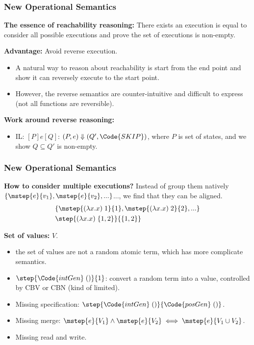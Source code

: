 \newcommand{\store}[1]{\langle #1 \rangle}

\begin{frame}[fragile]
    \frametitle{New Operational Semantics}

\textbf{The essence of reachability reasoning:} There exists an execution is equal to consider all possible executions and prove the set of executions is non-empty.

\textbf{Advantage:} Avoid reverse execution.
\begin{itemize}
    \item A natural way to reason about reachability is start from the end point and show it can reversely execute to the start point.
    \item However, the reverse semantics are counter-intuitive and difficult to express (not all functions are reversible).
\end{itemize}

\textbf{Work around reverse reasoning:}
\begin{itemize}
    \item IL: $[P] e [Q]$: $(P, e) \Downarrow (Q', \Code{SKIP})$, where $P$ is set of states, and we show $Q \subseteq Q'$ is non-empty.
\end{itemize}
        
\end{frame}

\begin{frame}[fragile]
    \frametitle{New Operational Semantics}

\textbf{How to consider multiple executions?} Instead of group them natively $\{\mstep{e}{v_1}, \mstep{e}{v_2}, ...\}$..., we find that they can be aligned.
\begin{align*}
    &\{\mstep{(\lambda x.x)\;1}{1}, \mstep{(\lambda x.x)\;2}{2}, ...\}
    \\&\step{(\lambda x.x)\;\{1, 2\}}{\{1, 2\}}
\end{align*}

\textbf{Set of values:} $V$.
\begin{itemize}
    \item the set of values are not a random atomic term, which has more complicate semantics.
    \item $\step{\Code{intGen}\;()}{1}$: convert a random term into a value, controlled by CBV or CBN (kind of limited).
    \item Missing specification: $\step{\Code{intGen}\;()}{\Code{posGen}\;()}$.
    \item Missing merge: $\mstep{e}{V_1} \land \mstep{e}{V_2} \iff \mstep{e}{V_1 \cup V_2}$.
    \item Missing read and write.
\end{itemize}
        
\end{frame}

